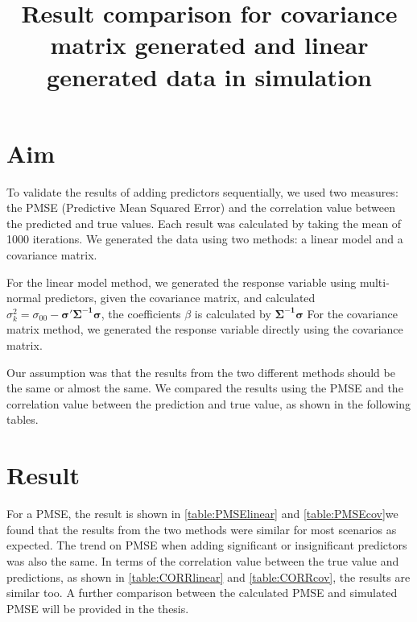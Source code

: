 \documentclass[12pt]{report}
\begin{document}
\thispagestyle{fancy}

\title{\bf Result comparison for covariance matrix generated and linear generated data in simulation}
\date{}
\maketitle
% 
%
%
%
%
%


\section{Aim}

To validate the results of adding predictors sequentially, we used two measures: the PMSE (Predictive Mean Squared Error) and the correlation value between the predicted and true values. Each result was calculated by taking the mean of 1000 iterations. We generated the data using two methods: a linear model and a covariance matrix.


For the linear model method, we generated the response variable using multi-normal predictors, given the covariance matrix, and calculated $\sigma_k^2 = \sigma_{00}-\bm{\sigma'\Sigma^{-1}\sigma}$, the coefficients $\beta$ is calculated by $\bm{\Sigma^{-1}\sigma}$ For the covariance matrix method, we generated the response variable directly using the covariance matrix.

Our assumption was that the results from the two different methods should be the same or almost the same. We compared the results using the PMSE and the correlation value between the prediction and true value, as shown in the following tables.

\section{Result}
For a PMSE, the result is shown in \ref{table:PMSElinear} and \ref{table:PMSEcov}we found that the results from the two methods were similar for most scenarios as expected. The trend on PMSE when adding significant or insignificant predictors was also the same. In terms of the correlation value between the true value and predictions, as shown in \ref{table:CORRlinear} and \ref{table:CORRcov}, the results are similar too. A further comparison between the calculated PMSE and simulated PMSE will be provided in the thesis.
\end{document}
